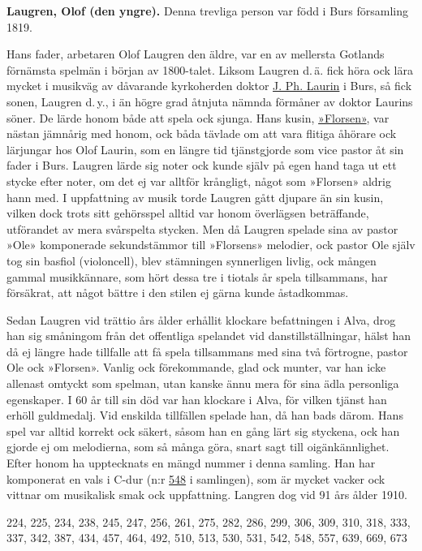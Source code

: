 \textbf{Laugren, Olof (den yngre).} Denna trevliga person var född i Burs församling 1819.

Hans fader, arbetaren Olof Laugren den äldre, var en av mellersta Gotlands förnämsta spelmän i början av 1800-talet. Liksom Laugren d.\,ä. fick höra ock lära mycket i musikväg av dåvarande kyrkoherden doktor \href{Laurin-J-F}{J. Ph. Laurin} i Burs, så fick sonen, Laugren d.\,y., i än högre grad åtnjuta nämnda förmåner av doktor Laurins söner. De lärde honom både att spela ock sjunga. Hans kusin, \href{Florsen}{»Florsen»}, var nästan jämnårig med honom, ock båda tävlade om att vara flitiga åhörare ock lärjungar hos Olof Laurin, som en längre tid tjänstgjorde som vice pastor åt sin fader i Burs. Laugren lärde sig noter ock kunde själv på egen hand taga ut ett stycke efter noter, om det ej var alltför krångligt, något som »Florsen» aldrig hann med. I uppfattning av musik torde Laugren gått djupare än sin kusin, vilken dock trots sitt gehörsspel alltid var honom överlägsen beträffande, utförandet av mera svårspelta stycken. Men då Laugren spelade sina av pastor »Ole» komponerade sekundstämmor till »Florsens» melodier, ock pastor Ole själv tog sin basfiol (violoncell), blev stämningen synnerligen livlig, ock mången gammal musikkännare, som hört dessa tre i tiotals år spela tillsammans, har försäkrat, att något bättre i den stilen ej gärna kunde åstadkommas.

Sedan Laugren vid trättio års ålder erhållit klockare befattningen i Alva, drog han sig småningom från det offentliga spelandet vid danstillställningar, hälst han då ej längre hade tillfalle att få spela tillsammans med sina två förtrogne, pastor Ole ock »Florsen». Vanlig ock förekommande, glad ock munter, var han icke allenast omtyckt som spelman, utan kanske ännu mera för sina ädla personliga egenskaper. I 60 år till sin död var han klockare i Alva, för vilken tjänst han erhöll guldmedalj. Vid enskilda tillfällen spelade han, då han bads därom. Hans spel var alltid korrekt ock säkert, såsom han en gång lärt sig styckena, ock han gjorde ej om melodierna, som så många göra, snart sagt till oigänkännlighet. Efter honom ha upptecknats en mängd nummer i denna samling. Han har komponerat en vals i C-dur (n:r \href{548}{548} i samlingen), som är mycket vacker ock vittnar om musikalisk smak ock uppfattning. Langren dog vid 91 års ålder 1910. 

224, 225, 234, 238, 245, 247, 256, 261, 275, 282, 286, 299, 306, 309, 310, 318, 333, 337, 342, 387, 434, 457, 464, 492, 510, 513, 530, 531, 542, 548, 557, 639, 669, 673 
